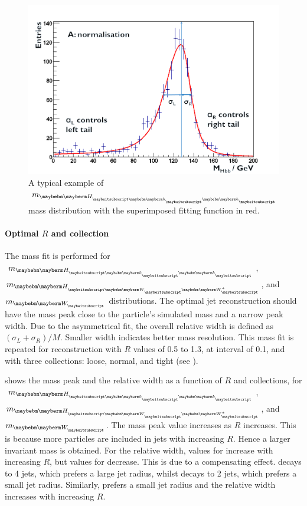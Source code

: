 \begin{figure}[!htbp]
\includegraphics[width=\largefigwidth]{doubleHiggs/MCmassFit}
\caption[Example MC mass fit for jet optimisation in double Higgs analysis]%
   {A typical example of  $m_{\Hbb}$  mass distribution with the superimposed fitting function in red.}
   \label{fig:doubleHiggsFitMCMass}
\end{figure}

\paragraph{Optimal $R$ and \PFO collection}

The mass fit is performed for $m_{\Hbb}$, $m_{\HWW}$, and $m_{\PW}$ distributions.  The optimal jet reconstruction should have the mass peak close to the particle's simulated mass and a narrow peak width. Due to the asymmetrical fit, the overall relative width is defined as $\left(\sigma_L  + \sigma_R\right)/M$. Smaller width indicates better mass resolution. This mass fit is repeated for reconstruction with $R$ values of 0.5 to 1.3, at interval of 0.1, and with three \PFO collections: loose, normal, and tight (see ).

 shows the mass peak and the relative width as a function of $R$ and \PFO collections, for $m_{\Hbb}$, $m_{\HWW}$, and $m_{\PW}$. The mass peak value increases as $R$ increases. This is because more particles are included in jets with increasing $R$. Hence a larger invariant mass is obtained. For the relative width, values for \Hbb increase with increasing $R$, but values for \HWW decrease. This is due to a compensating effect. \HWW decays to 4 jets, which prefers a large jet radius, whilst \Hbb decays to 2 jets, which prefers a small jet radius. Similarly, \PW prefers a small jet radius and the relative width increases with increasing $R$.

